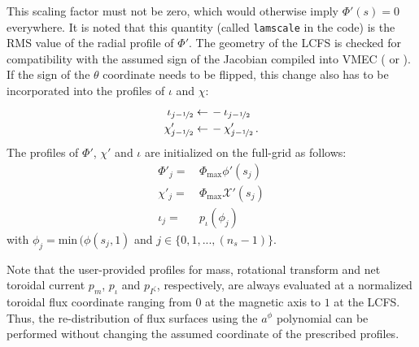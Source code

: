 This scaling factor must not be zero, which would otherwise imply $\Phi'(s)=0$ everywhere.
It is noted that this quantity (called \texttt{lamscale} in the code)
is the RMS value of the radial profile of $\Phi'$.
%
The geometry of the LCFS is checked for compatibility with the assumed sign of the Jacobian compiled into VMEC ( or ).
If the sign of the $\theta$ coordinate needs to be flipped, this change also has to be incorporated into the profiles of $\iota$ and $\chi$:
\begin{align}
  \iota_{j-\nicefrac{1}{2}} \leftarrow&\, -\iota_{j-\nicefrac{1}{2}} \\
  \chi'_{j-\nicefrac{1}{2}} \leftarrow&\, -\chi'_{j-\nicefrac{1}{2}} \, .
\end{align}
The profiles of $\Phi'$, $\chi'$ and $\iota$ are initialized on the full-grid as follows:
\begin{align}
  \Phi'_{j} =&\, \Phi_\mathrm{max} \phi'(s_{j}) \\
  \chi'_{j} =&\, \Phi_\mathrm{max} \mathcal{X}'(s_{j}) \\
  \iota_{j} =&\, p_\iota    (\phi_{j})
\end{align}
with $\phi_{j} = \mathrm{min}\,(\phi(s_{j}, 1)$ and $j \in \{ 0, 1, ..., (n_s-1) \}$.

Note that the user-provided profiles for mass, rotational transform and net toroidal current $p_m$, $p_\iota$ and $p_{I^\zeta}$, respectively,
are always evaluated at a normalized toroidal flux coordinate ranging from $0$ at the magnetic axis to $1$ at the LCFS.
Thus, the re-distribution of flux surfaces using the $a^\phi$ polynomial
can be performed without changing the assumed coordinate of the prescribed profiles.

